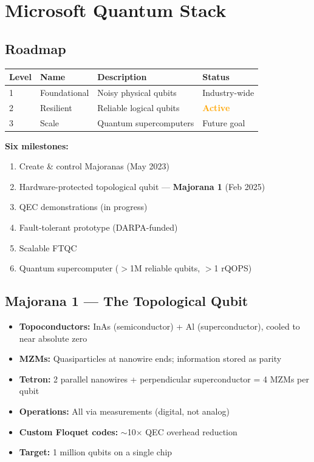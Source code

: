 \documentclass[11pt,a4paper]{article}
\begin{document}
\section{Microsoft Quantum Stack}

\subsection{Roadmap}

\begin{table}[H]
\centering
\begin{tabular}{llll}
\toprule
\textbf{Level} & \textbf{Name} & \textbf{Description} & \textbf{Status} \\
\midrule
1 & Foundational & Noisy physical qubits & Industry-wide \\
2 & Resilient & Reliable logical qubits & \textcolor{orange}{\textbf{Active}} \\
3 & Scale & Quantum supercomputers & Future goal \\
\bottomrule
\end{tabular}
\end{table}

\textbf{Six milestones:}
\begin{enumerate}
    \item[$\checkmark$] Create \& control Majoranas (May 2023)
    \item[$\checkmark$] Hardware-protected topological qubit --- \textbf{Majorana 1} (Feb 2025)
    \item[$\circ$] QEC demonstrations (in progress)
    \item[$\circ$] Fault-tolerant prototype (DARPA-funded)
    \item[$\circ$] Scalable FTQC
    \item[$\circ$] Quantum supercomputer ($>$1M reliable qubits, $>$1 rQOPS)
\end{enumerate}

\subsection{Majorana 1 --- The Topological Qubit}

\begin{itemize}
    \item \textbf{Topoconductors:} InAs (semiconductor) + Al (superconductor), cooled to near absolute zero
    \item \textbf{MZMs:} Quasiparticles at nanowire ends; information stored as parity
    \item \textbf{Tetron:} 2 parallel nanowires + perpendicular superconductor = 4 MZMs per qubit
    \item \textbf{Operations:} All via measurements (digital, not analog)
    \item \textbf{Custom Floquet codes:} $\sim$10$\times$ QEC overhead reduction
    \item \textbf{Target:} 1 million qubits on a single chip
\end{itemize}
\end{document}
